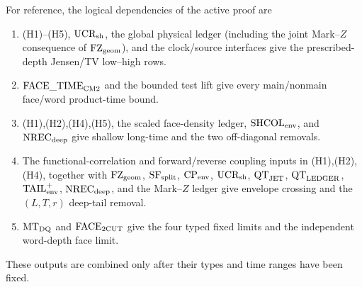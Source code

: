 \documentclass[11pt]{article}
\begin{document}
For reference, the logical dependencies of the active proof are
\begin{enumerate}[label=\textup{(D\arabic*)}]
\item \textup{(H1)--(H5)}, $\mathrm{UCR}_{\rm sh}$, the global physical
      ledger (including the joint Mark--$Z$ consequence of
      $\mathrm{FZ}_{\rm geom}$), and the clock/source interfaces give the
      prescribed-depth Jensen/TV low--high rows.
\item $\mathrm{FACE\_TIME}_{\rm CM2}$ and the bounded test lift give every
      main/nonmain face/word product-time bound.
\item \textup{(H1),(H2),(H4),(H5)}, the scaled face-density ledger,
      $\mathrm{SHCOL}_{\rm env}$, and $\mathrm{NREC}_{\rm deep}$ give
      shallow long-time and the two off-diagonal removals.
\item The functional-correlation and forward/reverse coupling inputs in
      \textup{(H1),(H2),(H4)}, together with
      $\mathrm{FZ}_{\rm geom}$, $\mathrm{SF}_{\rm split}$,
      $\mathrm{CP}_{\rm env}$, $\mathrm{UCR}_{\rm sh}$,
      $\mathrm{QT}_{\rm JET}$, $\mathrm{QT}_{\rm LEDGER}$,
      $\mathrm{TAIL}_{\rm env}^{+}$, $\mathrm{NREC}_{\rm deep}$, and the
      Mark--$Z$ ledger give envelope crossing and the $(L,T,r)$ deep-tail
      removal.
\item $\mathrm{MT}_{\rm DQ}$ and $\mathrm{FACE}_{\rm 2CUT}$ give the four
      typed fixed limits and the independent word-depth face limit.
\end{enumerate}
These outputs are combined only after their types and time ranges have been
fixed.
\end{document}
